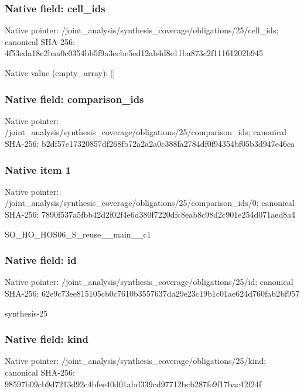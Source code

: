 \documentclass[10pt,a4paper]{article}
\begin{document}
\subsubsection{Native field: cell\_\allowbreak{}ids}
Native pointer: /joint\_\allowbreak{}analysis/synthesis\_\allowbreak{}coverage/obligations/25/cell\_\allowbreak{}ids; canonical SHA-256: 4f53cda18c2baa0c0354bb5f9a3ecbe5ed12ab4d8e11ba873c2f11161202b945

Native value (empty\_\allowbreak{}array): []

\subsubsection{Native field: comparison\_\allowbreak{}ids}
Native pointer: /joint\_\allowbreak{}analysis/synthesis\_\allowbreak{}coverage/obligations/25/comparison\_\allowbreak{}ids; canonical SHA-256: b2df57e17320857df268fb72a2a2a0c388fa2784df0f94354bf05b3d947e46ea

\subsubsection{Native item 1}
Native pointer: /joint\_\allowbreak{}analysis/synthesis\_\allowbreak{}coverage/obligations/25/comparison\_\allowbreak{}ids/0; canonical SHA-256: 7890f537a5fbb42d2f02f4e6d380f7220dfc8eab8c98d2c901e254d071aed8a4

\begingroup\raggedright\sloppy SO\_\allowbreak{}HO\_\allowbreak{}HOS06\_\allowbreak{}S\_\allowbreak{}reuse\_\allowbreak{}\_\allowbreak{}main\_\allowbreak{}\_\allowbreak{}c1\par\endgroup

\subsubsection{Native field: id}
Native pointer: /joint\_\allowbreak{}analysis/synthesis\_\allowbreak{}coverage/obligations/25/id; canonical SHA-256: 62e9c73ee815105cb0c7610b3557637da29e23c19b1c01ae624d760fab2bf957

\begingroup\raggedright\sloppy synthesis-25\par\endgroup

\subsubsection{Native field: kind}
Native pointer: /joint\_\allowbreak{}analysis/synthesis\_\allowbreak{}coverage/obligations/25/kind; canonical SHA-256: 98597b09cb9d7213d92c4bfee40d01abd339cd97712bcb287fe9f17bac42f24f
\end{document}
